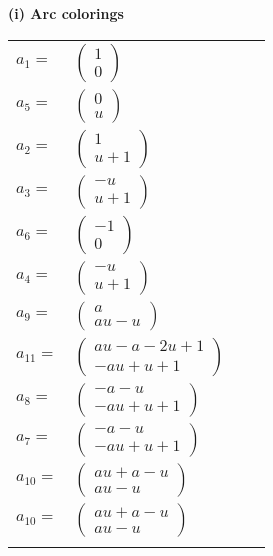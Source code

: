 \documentclass[1p]{elsarticle_modified}
\theoremstyle{definition}
\begin{document}
\flushleft \textbf{(i) Arc colorings}\\
\begin{tabular}{m{7pt} m{180pt} m{7pt} m{180pt} }
\flushright $a_{1}=$&$\begin{pmatrix}1\\0\end{pmatrix}$ \\
\flushright $a_{5}=$&$\begin{pmatrix}0\\u\end{pmatrix}$ \\
\flushright $a_{2}=$&$\begin{pmatrix}1\\u+1\end{pmatrix}$ \\
\flushright $a_{3}=$&$\begin{pmatrix}- u\\u+1\end{pmatrix}$ \\
\flushright $a_{6}=$&$\begin{pmatrix}-1\\0\end{pmatrix}$ \\
\flushright $a_{4}=$&$\begin{pmatrix}- u\\u+1\end{pmatrix}$ \\
\flushright $a_{9}=$&$\begin{pmatrix}a\\a u- u\end{pmatrix}$ \\
\flushright $a_{11}=$&$\begin{pmatrix}a u- a-2 u+1\\- a u+u+1\end{pmatrix}$ \\
\flushright $a_{8}=$&$\begin{pmatrix}- a- u\\- a u+u+1\end{pmatrix}$ \\
\flushright $a_{7}=$&$\begin{pmatrix}- a- u\\- a u+u+1\end{pmatrix}$ \\
\flushright $a_{10}=$&$\begin{pmatrix}a u+a- u\\a u- u\end{pmatrix}$\\ \flushright $a_{10}=$&$\begin{pmatrix}a u+a- u\\a u- u\end{pmatrix}$\\&\end{tabular}
\end{document}
